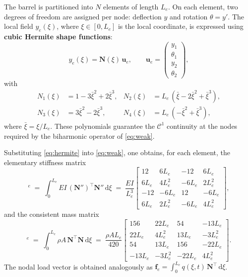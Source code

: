 \documentclass[12pt,a4paper]{article}
\begin{document}
	The barrel is partitioned into $N$ elements of length $L_e$. On each element, two degrees of freedom are assigned per node: deflection $y$ and rotation $\theta = y'$. The local field $y_e(\xi)$, where $\xi \in [0,L_e]$ is the local coordinate, is expressed using \textbf{cubic Hermite shape functions}:
	\begin{equation}
		\label{eq:hermite}
		y_e(\xi) = \mathbf{N}(\xi)\, \mathbf{u}_e, \qquad \mathbf{u}_e = \begin{pmatrix} y_1 \\ \theta_1 \\ y_2 \\ \theta_2 \end{pmatrix},
	\end{equation}
	with
	\begin{align*}
		N_1(\xi) &= 1 - 3\bar\xi^2 + 2\bar\xi^3, & N_2(\xi) &= L_e\,(\bar\xi - 2\bar\xi^2 + \bar\xi^3), \\
		N_3(\xi) &= 3\bar\xi^2 - 2\bar\xi^3, & N_4(\xi) &= L_e\,(-\bar\xi^2 + \bar\xi^3),
	\end{align*}
	where $\bar\xi = \xi/L_e$. These polynomials guarantee the $\mathcal{C}^1$ continuity at the nodes required by the biharmonic operator of \eqref{eq:weak}.

	Substituting \eqref{eq:hermite} into \eqref{eq:weak}, one obtains, for each element, the elementary stiffness matrix
	\begin{equation}
		[K]^e \;=\; \int_0^{L_e} EI\, (\mathbf{N}'')^{\!\top} \mathbf{N}'' \,\mathrm{d}\xi
		\;=\; \frac{EI}{L_e^3}
		\begin{bmatrix}
			12     & 6L_e   & -12    & 6L_e   \\
			6L_e   & 4L_e^2 & -6L_e  & 2L_e^2 \\
			-12    & -6L_e  & 12     & -6L_e  \\
			6L_e   & 2L_e^2 & -6L_e  & 4L_e^2
		\end{bmatrix},
	\end{equation}
	and the consistent mass matrix
	\begin{equation}
		[M]^e \;=\; \int_0^{L_e} \rho A\, \mathbf{N}^{\!\top} \mathbf{N} \,\mathrm{d}\xi
		\;=\; \frac{\rho A L_e}{420}
		\begin{bmatrix}
			156    & 22L_e  & 54     & -13L_e \\
			22L_e  & 4L_e^2 & 13L_e  & -3L_e^2 \\
			54     & 13L_e  & 156    & -22L_e \\
			-13L_e & -3L_e^2 & -22L_e & 4L_e^2
		\end{bmatrix}.
	\end{equation}
	The nodal load vector is obtained analogously as $\mathbf{f}_e = \int_0^{L_e} q(\xi,t)\, \mathbf{N}^{\!\top}\,\mathrm{d}\xi$.
\end{document}
